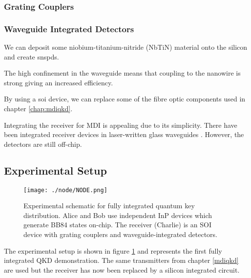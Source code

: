 \subsubsection*{Grating Couplers}

\subsubsection*{Waveguide Integrated Detectors}

We can deposit some niobium-titanium-nitride (NbTiN) material onto the silicon and create \acp{snspd}. 

The high confinement in the waveguide means that coupling to the nanowire is strong giving an increased efficiency. 

By using a \ac{soi} device, we can replace some of the fibre optic components used in chapter \ref{chap:mdiqkd}.

Integrating the receiver for \ac{MDI} is appealing due to its simplicity. There have been integrated receiver devices in laser-written glass waveguides \cite{wang2019}. However, the detectors are still off-chip.

%

\subsection{Experimental Setup}

\begin{figure}[t]
	\centering
	\texttt{[image: ./node/NODE.png]}
	\caption[Schematic of a fully optically integrated QKD system]{Experimental schematic for fully integrated quantum key distribution. Alice and Bob use independent InP devices which generate BB84 states on-chip. The receiver (Charlie) is an SOI device with grating couplers and waveguide-integrated detectors.}
	\label{fig:node}
\end{figure}

The experimental setup is shown in figure \ref{fig:node} and represents the first fully integrated \ac{QKD} demonstration. The same transmitters from chapter \ref{mdiqkd} are used but the receiver has now been replaced by a silicon integrated circuit. 

